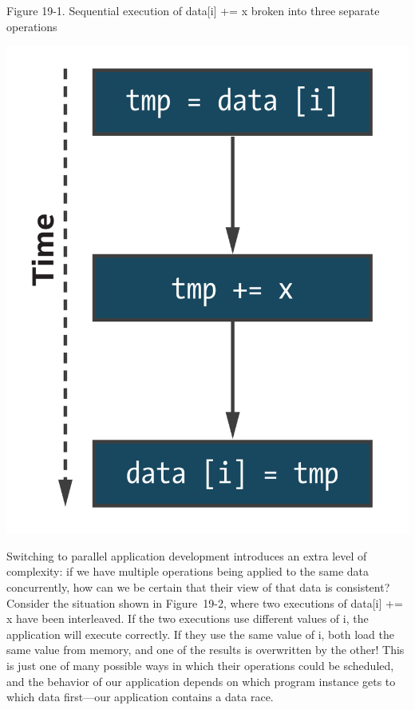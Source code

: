 \hspace*{\fill} \par %
Figure 19-1. Sequential execution of data[i] += x broken into three separate operations
\begin{center}
	\includegraphics[width=1.0\textwidth]{content/chapter-19/images/2}
\end{center}

Switching to parallel application development introduces an extra level of complexity: if we have multiple operations being applied to the same data concurrently, how can we be certain that their view of that data is consistent? Consider the situation shown in Figure 19-2, where two executions of data[i] += x have been interleaved. If the two executions use different values of i, the application will execute correctly. If they use the same value of i, both load the same value from memory, and one of the results is overwritten by the other! This is just one of many possible ways in which their operations could be scheduled, and the behavior of our application depends on which program instance gets to which data first—our application contains a data race.\par

